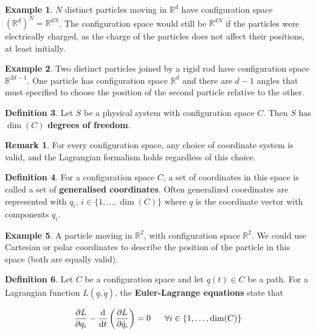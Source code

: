\documentclass[12pt,a4paper]{article}
\theoremstyle{definition}
\newtheorem{definition}{Definition}[subsection]
\newtheorem{example}[definition]{Example}
\newtheorem*{remark}{Remark}
\let\oldforall\forall
\renewcommand{\forall}{\ \oldforall}
\begin{document}
\begin{example}
	$N$ distinct particles moving in $\mathbb{R}^d$ have configuration space ${(\mathbb{R}^d)}^N = \mathbb{R}^{dN}$. The configuration space would still be $\mathbb{R}^{dN}$ if the particles were electrically charged, as the charge of the particles does not affect their positions, at least initially.
\end{example}

\begin{example}
	Two distinct particles joined by a rigid rod have configuration space $\mathbb{R}^{2d - 1}$. One particle has configuration space $\mathbb{R}^d$ and there are $d - 1$ angles that must specified to choose the position of the second particle relative to the other.
\end{example}

\begin{definition}
	Let $S$ be a physical system with configuration space $C$. Then $S$ has $\dim(C)$ \textbf{degrees of freedom}.
\end{definition}

\begin{remark}
	For every configuration space, any choice of coordinate system is valid, and the Lagrangian formalism holds regardless of this choice.
\end{remark}

\begin{definition}
	For a configuration space $C$, a set of coordinates in this space is called a set of \textbf{generalised coordinates}. Often generalized coordinates are represented with $q_i$, $i \in \{ 1, \dots, \dim(C) \}$ where $\underline{q}$ is the coordinate vector with components $q_i$.
\end{definition}

\begin{example}
	A particle moving in $\mathbb{R}^2$, with configuration space $\mathbb{R}^2$. We could use Cartesian or polar coordinates to describe the position of the particle in this space (both are equally valid).
\end{example}

\begin{definition}
	Let $C$ be a configuration space and let $\underline{q}(t) \in C$ be a path. For a Lagrangian function $L(\underline{q}, \underline{\dot{q}})$, the \textbf{Euler-Lagrange equations} state that

	\[ \diffp{L}{q_i} - \diff{}{t} \left( \diffp{L}{\dot{q}_i} \right) = 0 \quad \forall i \in \{ 1, \dots, \dim(C) \} \]
\end{definition}
\end{document}

